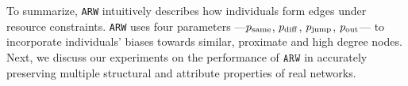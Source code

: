 To summarize, \texttt{ARW}
intuitively describes how individuals form edges under resource constraints.
\texttt{ARW} uses four parameters ---$p_{\scriptsize\mbox{same}}$, $p_{\scriptsize\mbox{diff}}$, $p_{\scriptsize\mbox{jump}}$, $p_{\scriptsize\mbox{out}}$--- to incorporate
individuals' biases towards similar, proximate and high degree nodes.
Next, we discuss our experiments on the performance of $\texttt{ARW}$
in accurately preserving {multiple} structural and attribute properties of real networks.
